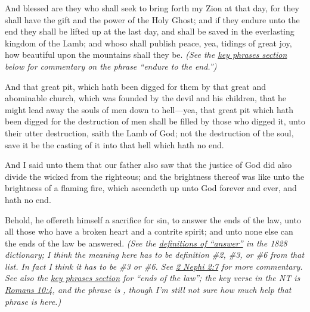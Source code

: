 		\begin{compactdesc}
			\item[1 Nephi 13:37] And blessed are they who shall seek to bring forth my Zion at that day, for they shall have the gift and the power of the Holy Ghost; and if they endure unto the end they shall be lifted up at the last day, and shall be saved in the everlasting kingdom of the Lamb; and whoso shall publish peace, yea, tidings of great joy, how beautiful upon the mountains shall they be.
				\textit{(See the \hyperref[END-PHRASES]{key phrases section} below for commentary on the phrase ``endure to the end.'')}
			\item[1 Nephi 14:3] And that great pit, which hath been digged for them by that great and abominable church, which was founded by the devil and his children, that he might lead away the souls of men down to hell---yea, that great pit which hath been digged for the destruction of men shall be filled by those who digged it, unto their utter destruction, saith the Lamb of God; not the destruction of the soul, save it be the casting of it into that hell which hath no end.
			\item[1 Nephi 15:30] And I said unto them that our father also saw that the justice of God did also divide the wicked from the righteous; and the brightness thereof was like unto the brightness of a flaming fire, which ascendeth up unto God forever and ever, and hath no end.
			\item[2 Nephi 2:7] Behold, he offereth himself a sacrifice for sin, to answer the ends of the law, unto all those who have a broken heart and a contrite spirit; and unto none else can the ends of the law be answered.
				\textit{(See the \hyperref[ANSWER-1828]{definitions of ``answer''} in the 1828 dictionary; I think the meaning here has to be definition \#2, \#3, or \#6 from that list. In fact I think it has to be \#3 or \#6. See \hyperref[2NEPHI-2-7]{2 Nephi 2:7} for more commentary. See also the \hyperref[END-PHRASES]{key phrases section} for ``ends of the law''; the key verse in the NT is \hyperref[ROMANS-10-4]{Romans 10:4}, and the phrase is , though I'm still not sure how much help that phrase is here.)}

\end{compactdesc}
